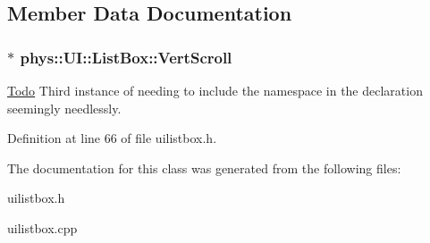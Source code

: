 \subsection{Member Data Documentation}
\hypertarget{classphys_1_1UI_1_1ListBox_ab2b012b345ff4bb1a5b228fef88d895c}{
\subsubsection[{VertScroll}]{$\ast$ {\bf phys::UI::ListBox::VertScroll}}}
\label{d0/d28/classphys_1_1UI_1_1ListBox_ab2b012b345ff4bb1a5b228fef88d895c}
\begin{Desc}
\item[\hyperlink{todo__todo000026}{Todo}]Third instance of needing to include the namespace in the declaration seemingly needlessly. \end{Desc}


Definition at line 66 of file uilistbox.h.



The documentation for this class was generated from the following files:\begin{DoxyCompactItemize}
\item 
uilistbox.h\item 
uilistbox.cpp\end{DoxyCompactItemize}
